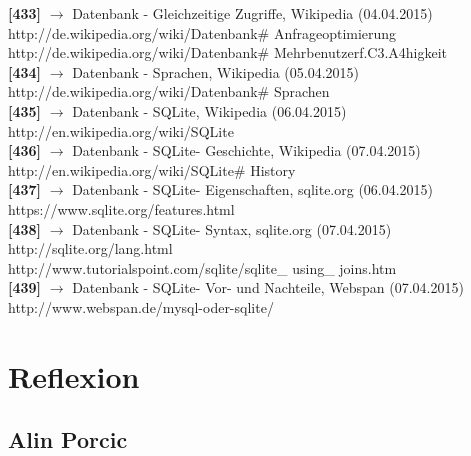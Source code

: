 \documentclass[12pt,a4paper]{report}
\begin{document}
\begin{onehalfspace}
\noindent
\textbf{[433]} $\rightarrow$ Datenbank - Gleichzeitige Zugriffe, Wikipedia (04.04.2015)\\
http://de.wikipedia.org/wiki/Datenbank\# Anfrageoptimierung\\
http://de.wikipedia.org/wiki/Datenbank\# Mehrbenutzerf.C3.A4higkeit\\

\noindent
\textbf{[434]} $\rightarrow$ Datenbank - Sprachen, Wikipedia (05.04.2015)\\
http://de.wikipedia.org/wiki/Datenbank\# Sprachen\\

\noindent
\textbf{[435]} $\rightarrow$ Datenbank - SQLite, Wikipedia (06.04.2015)\\
http://en.wikipedia.org/wiki/SQLite\\

\noindent
\textbf{[436]} $\rightarrow$ Datenbank - SQLite- Geschichte, Wikipedia (07.04.2015)\\
http://en.wikipedia.org/wiki/SQLite\# History\\

\noindent
\textbf{[437]} $\rightarrow$ Datenbank - SQLite- Eigenschaften, sqlite.org (06.04.2015)\\
https://www.sqlite.org/features.html\\

\noindent
\textbf{[438]} $\rightarrow$ Datenbank - SQLite- Syntax, sqlite.org (07.04.2015)\\
http://sqlite.org/lang.html\\
http://www.tutorialspoint.com/sqlite/sqlite\_ using\_ joins.htm\\

\noindent
\textbf{[439]} $\rightarrow$ Datenbank - SQLite- Vor- und Nachteile,  Webspan (07.04.2015)\\
http://www.webspan.de/mysql-oder-sqlite/\\

\end{onehalfspace}

\part{Reflexion}
\chapter{Alin Porcic}
\end{document}
